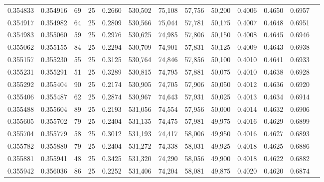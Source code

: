 \begin{tabular}{rrrrrrrrrrrrr}
0.354833 & 0.354916 &    69 &  25 &                                     0.2660 & 530,502 &  75,108 &  57,756 &  50,200 & 0.4006 & 0.4650 & 0.6957 \\
0.354917 & 0.354982 &    64 &  25 &                                     0.2809 & 530,566 &  75,044 &  57,781 &  50,175 & 0.4007 & 0.4648 & 0.6951 \\
0.354983 & 0.355060 &    59 &  25 &                                     0.2976 & 530,625 &  74,985 &  57,806 &  50,150 & 0.4008 & 0.4645 & 0.6946 \\
0.355062 & 0.355155 &    84 &  25 &                                     0.2294 & 530,709 &  74,901 &  57,831 &  50,125 & 0.4009 & 0.4643 & 0.6938 \\
0.355157 & 0.355230 &    55 &  25 &                                     0.3125 & 530,764 &  74,846 &  57,856 &  50,100 & 0.4010 & 0.4641 & 0.6933 \\
0.355231 & 0.355291 &    51 &  25 &                                     0.3289 & 530,815 &  74,795 &  57,881 &  50,075 & 0.4010 & 0.4638 & 0.6928 \\
0.355292 & 0.355404 &    90 &  25 &                                     0.2174 & 530,905 &  74,705 &  57,906 &  50,050 & 0.4012 & 0.4636 & 0.6920 \\
0.355406 & 0.355487 &    62 &  25 &                                     0.2874 & 530,967 &  74,643 &  57,931 &  50,025 & 0.4013 & 0.4634 & 0.6914 \\
0.355488 & 0.355604 &    89 &  25 &                                     0.2193 & 531,056 &  74,554 &  57,956 &  50,000 & 0.4014 & 0.4632 & 0.6906 \\
0.355605 & 0.355702 &    79 &  25 &                                     0.2404 & 531,135 &  74,475 &  57,981 &  49,975 & 0.4016 & 0.4629 & 0.6899 \\
0.355704 & 0.355779 &    58 &  25 &                                     0.3012 & 531,193 &  74,417 &  58,006 &  49,950 & 0.4016 & 0.4627 & 0.6893 \\
0.355782 & 0.355880 &    79 &  25 &                                     0.2404 & 531,272 &  74,338 &  58,031 &  49,925 & 0.4018 & 0.4625 & 0.6886 \\
0.355881 & 0.355941 &    48 &  25 &                                     0.3425 & 531,320 &  74,290 &  58,056 &  49,900 & 0.4018 & 0.4622 & 0.6882 \\
0.355942 & 0.356036 &    86 &  25 &                                     0.2252 & 531,406 &  74,204 &  58,081 &  49,875 & 0.4020 & 0.4620 & 0.6874 \\

\end{tabular}
